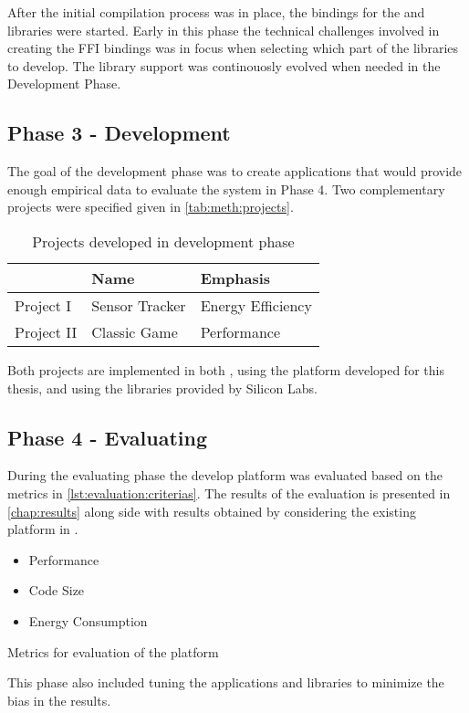 After the initial compilation process was in place, the bindings for the  and {\emlib} libraries were started.
Early in this phase the technical challenges involved in creating the FFI bindings was in focus when selecting which part of the libraries to develop.
The library support was continouosly evolved when needed in the Development Phase.

\subsection{Phase 3 - Development}
\label{sec:projects}

The goal of the development phase was to create applications that would provide enough empirical data to evaluate the system in Phase 4.
Two complementary projects were specified given in \autoref{tab:meth:projects}.

\begin{table}[H]
  \centering
  \begin{tabular}{l|l|l}
    & \textbf{Name} & \textbf{Emphasis} \\
    \hline
    Project I & Sensor Tracker & Energy Efficiency \\
    Project II & Classic Game & Performance \\
    \hline
  \end{tabular}
  \caption{Projects developed in development phase}
  \label{tab:meth:projects}
\end{table}

Both projects are implemented in both {\rust}, using the platform developed for this thesis, and {\C} using the libraries provided by Silicon Labs.

\subsection{Phase 4 - Evaluating}
During the evaluating phase the develop platform was evaluated based on the metrics in \autoref{lst:evaluation:criterias}.
The results of the evaluation is presented in \autoref{chap:results} along side with results obtained by considering the existing platform in {\C}.

\begin{listing}
  \begin{itemize}
  \item Performance
  \item Code Size
  \item Energy Consumption
  \end{itemize}
  \caption{Metrics for evaluation of the platform}
  \label{lst:evaluation:criterias}
\end{listing}
This phase also included tuning the applications and libraries to minimize the bias in the results.
